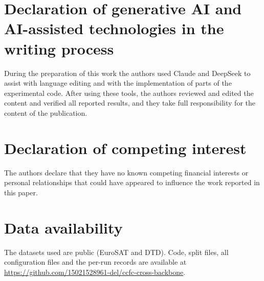 \documentclass[preprint,12pt]{elsarticle}
\begin{document}
\section*{Declaration of generative AI and AI-assisted technologies in the
writing process}
During the preparation of this work the authors used Claude and DeepSeek to
assist with language editing and with the implementation of parts of the
experimental code. After using these tools, the authors reviewed and edited the
content and verified all reported results, and they take full responsibility for
the content of the publication.

\section*{Declaration of competing interest}
The authors declare that they have no known competing financial interests or
personal relationships that could have appeared to influence the work reported
in this paper.

\section*{Data availability}
The datasets used are public (EuroSAT and DTD). Code, split files, all
configuration files and the per-run records are available at
\url{https://github.com/15021528961-del/ccfc-cross-backbone}.



\end{document}
